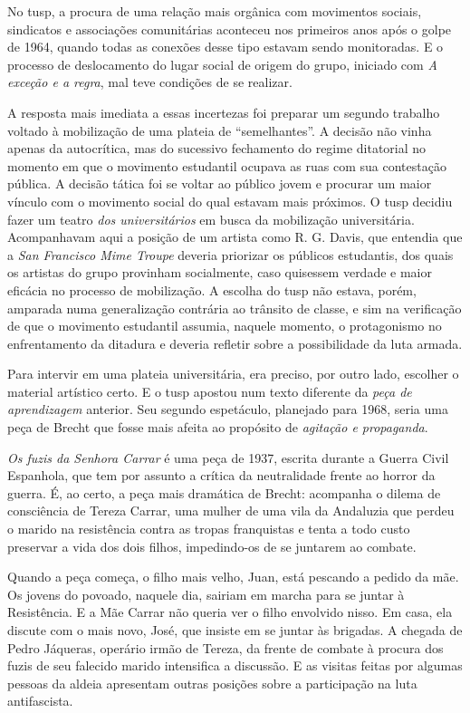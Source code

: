 No {\sc tusp}, a procura de uma relação mais orgânica com movimentos sociais,
sindicatos e associações comunitárias aconteceu nos primeiros anos após
o golpe de 1964, quando todas as conexões desse tipo estavam sendo
monitoradas. E o processo de deslocamento do lugar social de origem do
grupo, iniciado com {\it A} {\it exceção e a regra}, mal teve condições
de se realizar.

A resposta mais imediata a essas incertezas foi preparar um segundo
trabalho voltado à mobilização de uma plateia de “semelhantes”. A
decisão não vinha apenas da autocrítica, mas do sucessivo fechamento do
regime ditatorial no momento em que o movimento estudantil ocupava as
ruas com sua contestação pública. A decisão tática foi se voltar ao
público jovem e procurar um maior vínculo com o movimento social do qual
estavam mais próximos. O {\sc tusp} decidiu fazer um teatro {\it dos
universitários} em busca da mobilização universitária. Acompanhavam aqui
a posição de um artista como R. G. Davis, que entendia que a {\it San
Francisco Mime Troupe} deveria priorizar os públicos estudantis, dos
quais os artistas do grupo provinham socialmente, caso quisessem verdade
e maior eficácia no processo de mobilização. A escolha do {\sc tusp} não
estava, porém, amparada numa generalização contrária ao trânsito de
classe, e sim na verificação de que o movimento estudantil assumia,
naquele momento, o protagonismo no enfrentamento da ditadura e deveria
refletir sobre a possibilidade da luta armada.

Para intervir em uma plateia universitária, era preciso, por outro lado,
escolher o material artístico certo. E o {\sc tusp} apostou num texto
diferente da {\it peça de aprendizagem} anterior. Seu segundo
espetáculo, planejado para 1968, seria uma peça de Brecht que fosse mais
afeita ao propósito de {\it agitação e propaganda}.

\subject{Modelo de teatralidade: a cena de intervenção pelo drama social}

{\it Os fuzis da Senhora Carrar} é uma peça de 1937, escrita durante a
Guerra Civil Espanhola, que tem por assunto a crítica da neutralidade
frente ao horror da guerra. É, ao certo, a peça mais dramática de
Brecht: acompanha o dilema de consciência de Tereza Carrar, uma mulher
de uma vila da Andaluzia que perdeu o marido na resistência contra as
tropas franquistas e tenta a todo custo preservar a vida dos dois
filhos, impedindo-os de se juntarem ao combate.

Quando a peça começa, o filho mais velho, Juan, está pescando a pedido
da mãe. Os jovens do povoado, naquele dia, sairiam em marcha para se
juntar à Resistência. E a Mãe Carrar não queria ver o filho envolvido
nisso. Em casa, ela discute com o mais novo, José, que insiste em se
juntar às brigadas. A chegada de Pedro Jáqueras, operário irmão de
Tereza, da frente de combate à procura dos fuzis de seu falecido marido
intensifica a discussão. E as visitas feitas por algumas pessoas da
aldeia apresentam outras posições sobre a participação na luta
antifascista.

